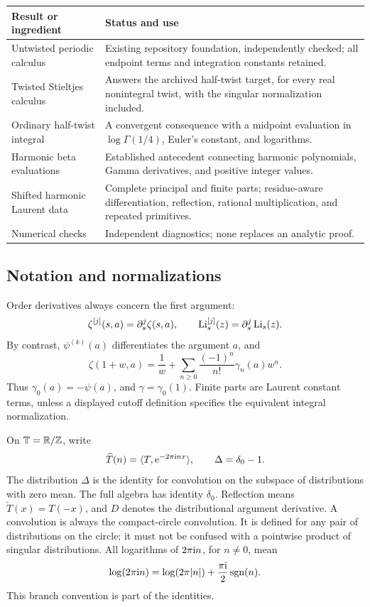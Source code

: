 \begin{center}
\begin{tabularx}{\textwidth}{@{}p{}X@{}}
\toprule
Result or ingredient & Status and use\\
\midrule
Untwisted periodic calculus &
Existing repository foundation, independently checked; all endpoint
terms and integration constants retained.\\[3pt]
Twisted Stieltjes calculus &
Answers the archived half-twist target, for every real nonintegral
twist, with the singular normalization included.\\[3pt]
Ordinary half-twist integral &
A convergent consequence with a midpoint evaluation in
\(\log\Gamma(1/4)\), Euler's constant, and logarithms.\\[3pt]
Harmonic beta evaluations &
Established antecedent connecting harmonic polynomials, Gamma
derivatives, and positive integer values.\\[3pt]
Shifted harmonic Laurent data &
Complete principal and finite parts; residue-aware differentiation,
reflection, rational multiplication, and repeated primitives.\\[3pt]
Numerical checks &
Independent diagnostics; none replaces an analytic proof.\\
\bottomrule
\end{tabularx}
\end{center}

\subsection{Notation and normalizations}

Order derivatives always concern the first argument:
\[
 \zeta^{[j]}(s,a)=\partial_s^j\zeta(s,a),\qquad
 \operatorname{Li}_s^{[j]}(z)=\partial_s^j\operatorname{Li}_s(z).
\]
By contrast, \(\psi^{(k)}(a)\) differentiates the argument \(a\), and
\begin{equation}\label{scope:stieltjes}
 \zeta(1+w,a)=\frac1w+
       \sum_{n\geq0}\frac{(-1)^n}{n!}\gamma_n(a)w^n.
\end{equation}
Thus \(\gamma_0(a)=-\psi(a)\), and \(\gamma=\gamma_0(1)\).
Finite parts are Laurent constant terms, unless a displayed cutoff
definition specifies the equivalent integral normalization.

On \(\mathbb T=\mathbb R/\mathbb Z\), write
\[
 \widehat T(n)=\langle T,\mathrm e^{-2\pi\mathrm i n x}\rangle,\qquad
 \Delta=\delta_0-1.
\]
The distribution \(\Delta\) is the identity for convolution on the
subspace of distributions with zero mean. The full algebra has identity
\(\delta_0\). Reflection means
\(\check T(x)=T(-x)\), and \(D\) denotes the distributional argument
derivative. A convolution is always the compact-circle convolution.
It is defined for any pair of distributions on the circle; it must
not be confused with a pointwise product of singular distributions.
All logarithms of \(2\pi\mathrm i n\), for \(n\ne0\), mean
\[
 \log(2\pi\mathrm i n)=\log(2\pi|n|)
                 +\frac{\pi\mathrm i}{2}\operatorname{sgn}(n).
\]
This branch convention is part of the identities.

